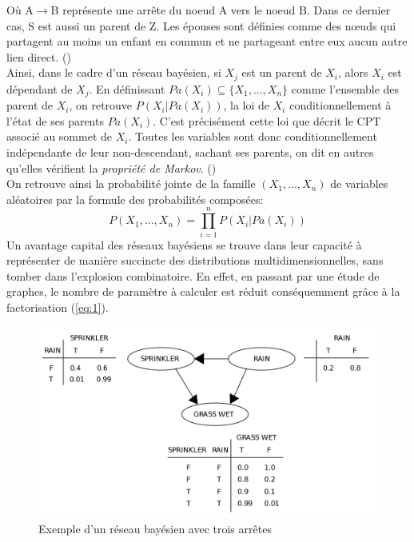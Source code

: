 \noindent Où \(\mathrm{A} \rightarrow \mathrm{B} \) représente une arrête du noeud \(\mathrm{A}\) vers le noeud \(\mathrm{B}\). Dans ce dernier cas, \(\mathrm{S}\) est aussi un parent de \(\mathrm{Z}\). Les épouses sont définies comme des nœuds qui partagent au moins un enfant en commun et ne partageant entre eux aucun autre lien direct. (\cite{FouillesMassivesSoins})
\\
Ainsi, dans le cadre d'un réseau bayésien, si \(X_j\) est un parent de \(X_i\), alors \(X_i\) est dépendant de \(X_j\). En définissant \( Pa(X_i) \subseteq \{X_1,..., X_n\} \) comme l'ensemble des parent de \(X_i\), on retrouve \(P(X_i | Pa(X_i))\), la loi de \(X_i\) conditionnellement à l’état de ses parents \(Pa(X_i)\). C'est précisément cette loi que décrit le CPT associé au sommet de \(X_i\). Toutes les variables sont donc conditionnellement indépendante de leur non-descendant, sachant ses parents, on dit en autres qu'elles vérifient la \textit{propriété de Markov}. (\cite{gene_network})
\\
On retrouve ainsi la probabilité jointe de la famille \((X_1,..., X_n)\) de variables aléatoires par la formule des probabilités composées:
\begin{equation}
\label{eq:1}
    P(X_1,..., X_n) = \prod_{i=1}^{n}P(X_i | Pa(X_i))
\end{equation}
Un avantage capital des réseaux bayésiens se trouve dans leur capacité à représenter de manière succincte des distributions multidimensionnelles, sans tomber dans l'explosion combinatoire. En effet, en passant par une étude de graphes, le nombre de paramètre à calculer est réduit conséquemment grâce à la factorisation (\ref{eq:1}).
\begin{figure}
\centering
\includegraphics[scale=0.18]{SimpleBayesNet.png}
\caption{Exemple d'un réseau bayésien avec trois arrêtes}
\label{fig:ExBN}
\end{figure}


